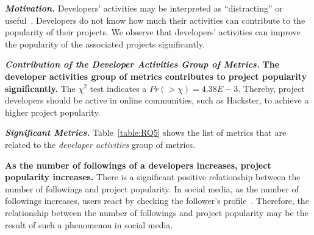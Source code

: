 \noindent \textbf{\RQfive}




\vspace{0.1cm}

\noindent\textbf{\textit{Motivation.}} 
Developers' activities may be interpreted as ``distracting'' or useful~\cite{leonardi2013enterprise}. Developers do not know how much their activities can contribute to the popularity of their projects. We observe that developers' activities can improve the popularity of the associated projects significantly.

\vspace{0.1cm}

\noindent\textbf{\textit{Contribution of the Developer Activities Group of Metrics.}} \textbf{The developer activities group of metrics contributes to project popularity significantly.} The $\chi^2$ test indicates a $Pr(>\chi)=4.38E-3$. Thereby, project developers should be active in online communities, such as Hackster, to achieve a higher project popularity.

\vspace{0.1cm}



\noindent\textbf{\textit{Significant Metrics.}} Table~\ref{table:RQ5} shows the
list of metrics that are related to the {\em developer activities} group of metrics.

\textbf{As the number of followings of a developers increases, project popularity increases.} There is a significant positive relationship between the number of followings and project popularity. In social media, as the number of followings increases, users react by checking the follower's profile~\cite{kwak2010twitter,postill2012social}. Therefore, the relationship between the number of followings and project popularity may be the result of such a phenomenon in social media.


